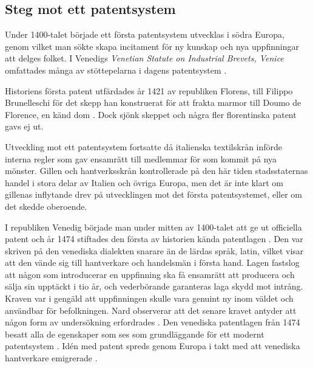 \subsection{Steg mot ett patentsystem} 

Under 1400-talet började ett första patentsystem utvecklas i södra Europa, genom vilket man sökte skapa incitament för ny kunskap och nya uppfinningar att delges folket. 
I Venedigs \emph{Venetian Statute on Industrial Brevets, Venice} omfattades många av stöttepelarna i dagens patentsystem \cite{nard}.

Historiens första patent utfärdades år 1421 av republiken Florens, till Filippo Brunelleschi för det skepp han konstruerat för att frakta marmor till Doumo de Florence, en känd dom \cite{frumkin}. 
Dock sjönk skeppet och några fler florentinska patent gavs ej ut.

Utveckling mot ett patentsystem fortsatte då italienska textilskrån införde interna regler som gav ensamrätt till medlemmar för som kommit på nya mönster.
Gillen och hantverksskrån kontrollerade på den här tiden stadsstaternas handel i stora delar av Italien och övriga Europa, men det är inte klart om gillenas inflytande drev på utvecklingen mot det första patentsystemet, eller om det skedde oberoende.

I republiken Venedig började man under mitten av 1400-talet att ge ut officiella patent och år 1474 stiftades den första av historien kända patentlagen \cite{frumkin}.
Den var skriven på den venediska dialekten snarare än de lärdas språk, latin, vilket visar att den vände sig till hantverkare och handelsmän i första hand.
Lagen fastslog att någon som introducerar en uppfinning ska få ensamrätt att producera och sälja sin upptäckt i tio år, och vederbörande garanteras laga skydd mot intrång. 
Kraven var i gengäld att uppfinningen skulle vara genuint ny inom väldet och användbar för befolkningen. 
Nard observerar att det senare kravet antyder att någon form av undersökning erfordrades \cite{nard}. 
Den venediska patentlagen från 1474 besatt alla de egenskaper som ses som grundläggande för ett modernt patentsystem \cite{nard}. Idén med patent spreds genom Europa i takt med att venediska hantverkare emigrerade \cite{nard}. 



